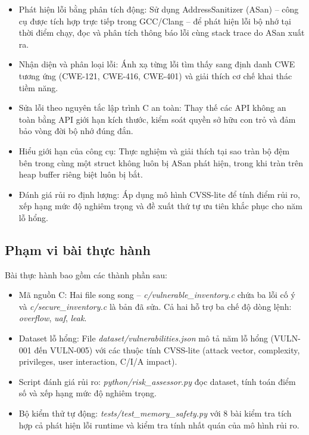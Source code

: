 \begin{itemize}
    \item Phát hiện lỗi bằng phân tích động: Sử dụng AddressSanitizer
          (ASan) -- công cụ được tích hợp trực tiếp trong GCC/Clang -- để phát
          hiện lỗi bộ nhớ tại thời điểm chạy, đọc và phân tích thông báo lỗi
          cùng stack trace do ASan xuất ra.
    \item Nhận diện và phân loại lỗi: Ánh xạ từng lỗi tìm thấy sang
          định danh CWE tương ứng (CWE-121, CWE-416, CWE-401) và giải thích cơ
          chế khai thác tiềm năng.
    \item Sửa lỗi theo nguyên tắc lập trình C an toàn: Thay thế các
          API không an toàn bằng API giới hạn kích thước, kiểm soát quyền sở hữu
          con trỏ và đảm bảo vòng đời bộ nhớ đúng đắn.
    \item Hiểu giới hạn của công cụ: Thực nghiệm và giải thích tại sao
          tràn bộ đệm bên trong cùng một struct không luôn bị ASan phát hiện,
          trong khi tràn trên heap buffer riêng biệt luôn bị bắt.
    \item Đánh giá rủi ro định lượng: Áp dụng mô hình CVSS-lite để
          tính điểm rủi ro, xếp hạng mức độ nghiêm trọng và đề xuất thứ tự ưu
          tiên khắc phục cho năm lỗ hổng.
\end{itemize}

\subsection{Phạm vi bài thực hành}

Bài thực hành bao gồm các thành phần sau:

\begin{itemize}
    \item Mã nguồn C: Hai file song song --
          \textit{c/vulnerable\_inventory.c} chứa ba lỗi cố ý và
          \textit{c/secure\_inventory.c} là bản đã sửa. Cả hai hỗ trợ ba chế độ
          dòng lệnh: \textit{overflow}, \textit{uaf}, \textit{leak}.
    \item Dataset lỗ hổng: File \textit{dataset/vulnerabilities.json}
          mô tả năm lỗ hổng (VULN-001 đến VULN-005) với các thuộc tính CVSS-lite
          (attack vector, complexity, privileges, user interaction, C/I/A impact).
    \item Script đánh giá rủi ro: \textit{python/risk\_assessor.py} đọc
          dataset, tính toán điểm số và xếp hạng mức độ nghiêm trọng.
    \item Bộ kiểm thử tự động: \textit{tests/test\_memory\_safety.py}
          với 8 bài kiểm tra tích hợp cả phát hiện lỗi runtime và kiểm tra tính
          nhất quán của mô hình rủi ro.
\end{itemize}

